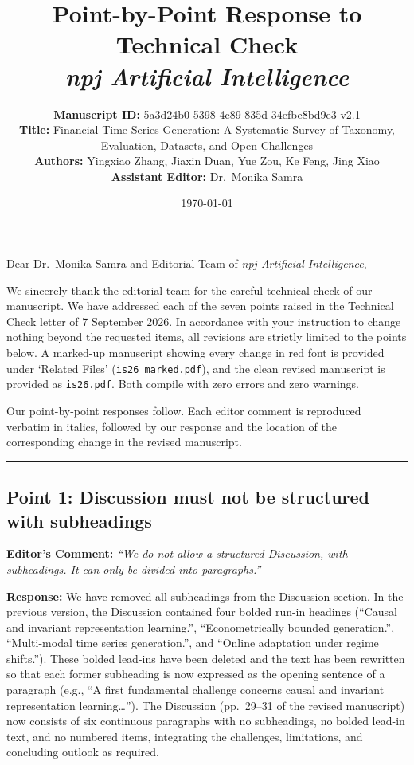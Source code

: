 \documentclass[11pt,a4paper]{article}
\title{\textbf{Point-by-Point Response to Technical Check}\\[0.3em]
\large \textit{npj Artificial Intelligence}}
\author{\textbf{Manuscript ID:} 5a3d24b0-5398-4e89-835d-34efbe8bd9e3 v2.1\\
\textbf{Title:} Financial Time-Series Generation: A Systematic Survey of Taxonomy, Evaluation, Datasets, and Open Challenges\\
\textbf{Authors:} Yingxiao Zhang, Jiaxin Duan, Yue Zou, Ke Feng, Jing Xiao\\
\textbf{Assistant Editor:} Dr.~Monika Samra}
\date{\today}
\begin{document}
\maketitle

\noindent Dear Dr.~Monika Samra and Editorial Team of \textit{npj Artificial Intelligence},

\vspace{0.8em}
\noindent We sincerely thank the editorial team for the careful technical check of our manuscript. We have addressed each of the seven points raised in the Technical Check letter of 7 September 2026. In accordance with your instruction to change nothing beyond the requested items, all revisions are strictly limited to the points below. A marked-up manuscript showing every change in red font is provided under `Related Files' (\texttt{is26\_marked.pdf}), and the clean revised manuscript is provided as \texttt{is26.pdf}. Both compile with zero errors and zero warnings.

\vspace{0.8em}
\noindent Our point-by-point responses follow. Each editor comment is reproduced verbatim in italics, followed by our response and the location of the corresponding change in the revised manuscript.

\vspace{1.5em}
\hrule
\vspace{1.5em}

\subsection*{Point 1: Discussion must not be structured with subheadings}

\vspace{0.5em}
\noindent\textbf{Editor's Comment:}
\textit{``We do not allow a structured Discussion, with subheadings. It can only be divided into paragraphs.''}

\vspace{0.5em}
\noindent\textbf{Response:}
We have removed all subheadings from the Discussion section. In the previous version, the Discussion contained four bolded run-in headings (``Causal and invariant representation learning.'', ``Econometrically bounded generation.'', ``Multi-modal time series generation.'', and ``Online adaptation under regime shifts.''). These bolded lead-ins have been deleted and the text has been rewritten so that each former subheading is now expressed as the opening sentence of a paragraph (e.g., ``A first fundamental challenge concerns causal and invariant representation learning\ldots''). The Discussion (pp.~29--31 of the revised manuscript) now consists of six continuous paragraphs with no subheadings, no bolded lead-in text, and no numbered items, integrating the challenges, limitations, and concluding outlook as required.
\end{document}
